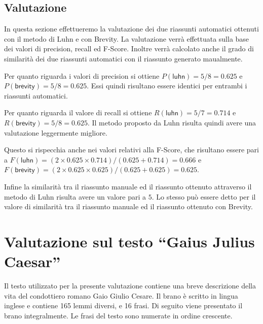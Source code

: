 \subsection*{Valutazione}
In questa sezione effettueremo la valutazione dei due riassunti automatici ottenuti con il metodo di Luhn e con Brevity.
La valutazione verr\`{a} effettuata sulla base dei valori di precision, recall ed F-Score. Inoltre verr\`{a} calcolato anche il grado di similarit\`{a} dei due riassunti automatici con il riassunto generato maualmente.

Per quanto riguarda i valori di precision si ottiene $P(\textsf{luhn})= 5 / 8 = 0.625$ e $P(\textsf{brevity})= 5 / 8 = 0.625$. Essi quindi risultano essere
identici per entrambi i riassunti automatici.

Per quanto riguarda il valore di recall si ottiene $R(\textsf{luhn})= 5 / 7 = 0.714$ e $R(\textsf{brevity})= 5 / 8 = 0.625$. Il metodo proposto da Luhn risulta quindi avere una valutazione leggermente migliore.

Questo si rispecchia anche nei valori relativi alla F-Score, che risultano essere pari a $F(\textsf{luhn})= (2 \times 0.625 \times 0.714) / (0.625 + 0.714) = 0.666$ e
$F(\textsf{brevity})= (2 \times 0.625 \times 0.625) / (0.625 + 0.625) = 0.625$.

Infine la similarit\`{a} tra il riassunto manuale ed il riassunto ottenuto attraverso il metodo di Luhn risulta avere un valore pari a $5$.
Lo stesso pu\`{o} essere detto per il valore di similarit\`{a} tra il riassunto manuale ed il riassunto ottenuto con Brevity.



\newpage
\section{Valutazione sul testo ``Gaius Julius Caesar''}
Il testo utilizzato per la presente valutazione contiene una breve descrizione della vita del condottiero romano Gaio Giulio Cesare.
Il brano \`{e} scritto in lingua inglese e contiene 165 lemmi diversi, e 16 frasi.
Di seguito viene presentato il brano integralmente. Le frasi del testo sono numerate in ordine crescente.

